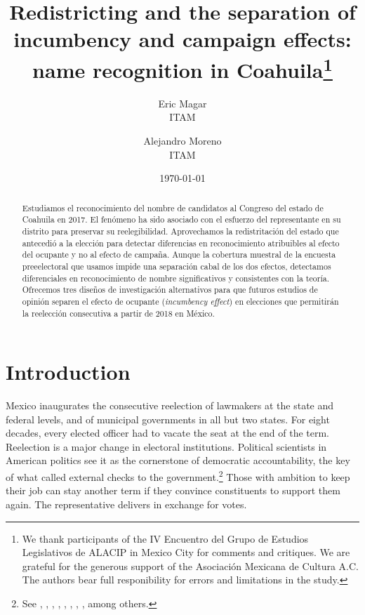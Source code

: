 \documentclass[letter,12pt]{article}
\begin{document}
\title{Redistricting and the separation of incumbency and campaign effects: name recognition in Coahuila\thanks{We thank participants of the IV Encuentro del Grupo de Estudios Legislativos de ALACIP in Mexico City for comments and critiques. We are grateful for the generous support of the Asociación Mexicana de Cultura A.C. The authors bear full responibility for errors and limitations in the study.}}
\author{Eric Magar  \\ ITAM \and
        Alejandro Moreno \\ ITAM 
}
\date{\today}
\maketitle


\begin{abstract}
\noindent Estudiamos el reconocimiento del nombre de candidatos al Congreso del estado de Coahuila en 2017. El fenómeno ha sido asociado con el esfuerzo del representante en su distrito para preservar su reelegibilidad. Aprovechamos la redistritación del estado que antecedió a la elección para detectar diferencias en reconocimiento atribuibles al efecto del ocupante y no al efecto de campaña. Aunque la cobertura muestral de la encuesta preeelectoral que usamos impide una separación cabal de los dos efectos, detectamos diferenciales en reconocimiento de nombre significativos y consistentes con la teoría. Ofrecemos tres diseños de investigación alternativos para que futuros estudios de opinión separen el efecto de ocupante (\emph{incumbency effect}) en elecciones que permitirán la reelección consecutiva a partir de 2018 en México. 
\end{abstract}


\onehalfspacing

\section{Introduction}

\noindent Mexico inaugurates the consecutive reelection of lawmakers at the state and federal levels, and of municipal governments in all but two states.  For eight decades, every elected officer had to vacate the seat at the end of the term. Reelection is a major change in electoral institutions. Political scientists in American politics see it as the cornerstone of democratic accountability, the key of what \citet{madison.1788} called external checks to the government.\footnote{See \citet{schlesinger.1966}, \citet{mayhew.1974}, \citet{fenno.1978}, \citet{cain.etal.1987}, \citet{mccubbins.sullivan.1987}, \citet{cox.mccubbins.1993}, \citet{weingast.marshall.1988}, \citet{jacobson.1997}, among others.} Those with ambition to keep their job can stay another term if they convince constituents to support them again. The representative delivers in exchange for votes. 
\end{document}

